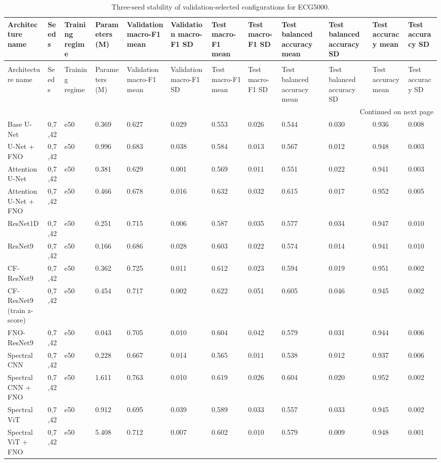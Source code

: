 \begin{longtable}{llllllllllll}
\caption{Three-seed stability of validation-selected configurations for ECG5000.} \label{tab:ecg5000_seed_stability} \\
\toprule
Architecture name & Seeds & Training regime & Parameters (M) & Validation macro-F1 mean & Validation macro-F1 SD & Test macro-F1 mean & Test macro-F1 SD & Test balanced accuracy mean & Test balanced accuracy SD & Test accuracy mean & Test accuracy SD \\
\midrule
\endfirsthead
\caption[]{Three-seed stability of validation-selected configurations for ECG5000.} \\
\toprule
Architecture name & Seeds & Training regime & Parameters (M) & Validation macro-F1 mean & Validation macro-F1 SD & Test macro-F1 mean & Test macro-F1 SD & Test balanced accuracy mean & Test balanced accuracy SD & Test accuracy mean & Test accuracy SD \\
\midrule
\endhead
\midrule
\multicolumn{12}{r}{Continued on next page} \\
\midrule
\endfoot
\bottomrule
\endlastfoot
Base U-Net & 0,7,42 & e50 & 0.369 & 0.627 & 0.029 & 0.553 & 0.026 & 0.544 & 0.030 & 0.936 & 0.008 \\
U-Net + FNO & 0,7,42 & e50 & 0.996 & 0.683 & 0.038 & 0.584 & 0.013 & 0.567 & 0.012 & 0.948 & 0.003 \\
Attention U-Net & 0,7,42 & e50 & 0.381 & 0.629 & 0.001 & 0.569 & 0.011 & 0.551 & 0.022 & 0.941 & 0.003 \\
Attention U-Net + FNO & 0,7,42 & e50 & 0.466 & 0.678 & 0.016 & 0.632 & 0.032 & 0.615 & 0.017 & 0.952 & 0.005 \\
ResNet1D & 0,7,42 & e50 & 0.251 & 0.715 & 0.006 & 0.587 & 0.035 & 0.577 & 0.034 & 0.947 & 0.010 \\
ResNet9 & 0,7,42 & e50 & 0.166 & 0.686 & 0.028 & 0.603 & 0.022 & 0.574 & 0.014 & 0.941 & 0.010 \\
CF-ResNet9 & 0,7,42 & e50 & 0.362 & 0.725 & 0.011 & 0.612 & 0.023 & 0.594 & 0.019 & 0.951 & 0.002 \\
CF-ResNet9 (train z-score) & 0,7,42 & e50 & 0.454 & 0.717 & 0.002 & 0.622 & 0.051 & 0.605 & 0.046 & 0.945 & 0.002 \\
FNO-ResNet9 & 0,7,42 & e50 & 0.043 & 0.705 & 0.010 & 0.604 & 0.042 & 0.579 & 0.031 & 0.944 & 0.006 \\
Spectral CNN & 0,7,42 & e50 & 0.228 & 0.667 & 0.014 & 0.565 & 0.011 & 0.538 & 0.012 & 0.937 & 0.006 \\
Spectral CNN + FNO & 0,7,42 & e50 & 1.611 & 0.763 & 0.010 & 0.619 & 0.026 & 0.604 & 0.020 & 0.952 & 0.002 \\
Spectral ViT & 0,7,42 & e50 & 0.912 & 0.695 & 0.039 & 0.589 & 0.033 & 0.557 & 0.033 & 0.945 & 0.002 \\
Spectral ViT + FNO & 0,7,42 & e50 & 5.408 & 0.712 & 0.007 & 0.602 & 0.010 & 0.579 & 0.009 & 0.948 & 0.001 \\
\end{longtable}
